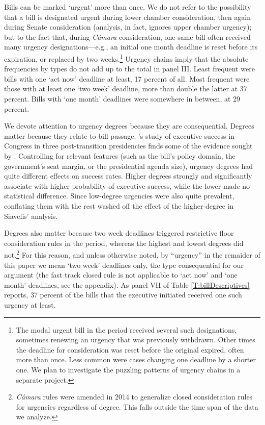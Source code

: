 \documentclass[letter,12pt]{article}
\begin{document}
Bills can be marked `urgent' more than once. We do not refer to the possibility that a bill is designated urgent during lower chamber consideration, then again during Senate consideration (analysis, in fact, ignores upper chamber urgency); but to the fact that, during \emph{Cámara} consideration, one same bill often received many urgency designations---e.g., an initial one month deadline is reset before its expiration, or replaced by two weeks.\footnote{The modal urgent bill in the period received several such designations, sometimes renewing an urgency that was previously withdrawn. Other times the deadline for consideration was reset before the original expired, often more than once. Less common were cases changing one deadline by a shorter one. We plan to investigate the puzzling patterns of urgency chains in a separate project.} Urgency chains imply that the absolute frequencies by types do not add up to the total in panel III. Least frequent were bills with one `act now' deadline at least, 17 percent of all. Most frequent were those with at least one `two week' deadline, more than double the latter at 37 percent. Bills with `one month' deadlines were somewhere in between, at 29 percent.

We devote attention to urgency degrees because they are consequential. Degrees matter because they relate to bill passage. \citeauthor{aleman.navia.UrgChi.2009}'s \citeyearpar{aleman.navia.UrgChi.2009} study of executive success in Congress in three post-transition presidencies finds some of the evidence sought by \citet{siavelis.2002}. Controlling for relevant features (such as the bill's policy domain, the government's seat margin, or the presidential agenda size), urgency degrees had quite different effects on success rates. Higher degrees strongly and significantly associate with higher probability of executive success, while the lower made no statistical difference. Since low-degree urgencies were also quite prevalent, conflating them with the rest washed off the effect of the higher-degree in Siavelis' analysis. 


Degrees also matter because two week deadlines triggered restrictive floor consideration rules in the period, whereas the highest and lowest degrees did not.\footnote{\emph{Cámara} rules were amended in 2014 to generalize closed consideration rules for urgencies regardless of degree. This falls outside the time span of the data we analyze.} For this reason, and unless otherwise noted, by ``urgency'' in the remaider of this paper we mean `two week' deadlines only, the type consequential for our argument (the fast track closed rule is not applicable to `act now' and `one month' deadlines, see the appendix). As panel VII of Table \ref{T:billDescriptives} reports, 37 percent of the bills that the executive initiated received one such urgency at least. 
\end{document}
